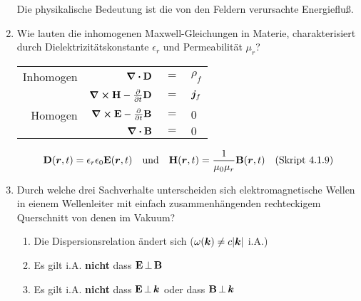 \begin{enumerate}
        \begin{center}
          Die physikalische Bedeutung ist die von den 
          Feldern verursachte Energiefluß.
        \end{center}

  \clearpage
  \item Wie lauten die inhomogenen Maxwell-Gleichungen in Materie,
        charakterisiert durch Dielektrizitätskonstante $\epsilon_r$ und
        Permeabilität $\mu_r$?
        \begin{center}
          \begin{tabular}{rrcl}
            Inhomogen&$\div \vb D$ & $=$ &$\rho_f$\\
            &$\curl \vb H-\pdv{t}\vb D$ & $=$ &$\vb* j_f$\\
            Homogen&$\curl \vb E-\pdv{t}\vb B$ & $=$ &$0$\\
            &$\div \vb B$ & $=$ &$0$\\
          \end{tabular}
          $$\vb D(\vb* r,t)=\epsilon_r\epsilon_0\vb E(\vb* r,t) \quad
          \text{und}\quad\vb H(\vb* r, t)=\frac{1}{\mu_0\mu_r}
          \vb B(\vb* r,t)\quad\text{(Skript 4.1.9)}$$
        \end{center}

  \item Durch welche drei Sachverhalte unterscheiden sich 
        elektromagnetische Wellen in eienem Wellenleiter mit einfach
        zusammenhängenden rechteckigem Querschnitt von denen im Vakuum?
        \begin{enumerate}
          \item Die Dispersionsrelation ändert sich 
                ($\omega(\vb* k)\ne c\abs{\vb* k}$ i.A.)
          \item Es gilt i.A. \textbf{nicht} dass $\vb E\,\bot\,\vb B$
          \item Es gilt i.A. \textbf{nicht} dass $\vb E\,\bot\,\vb* k$
                oder dass $\vb B\,\bot\,\vb* k$
        \end{enumerate}
        \begin{center}
        \end{center}


\end{enumerate}
